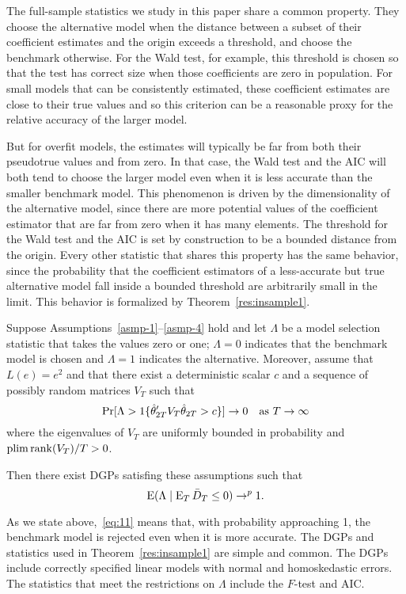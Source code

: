 \documentclass[12pt]{article}
\begin{document}
The full-sample statistics we study in this paper share a common
property. They choose the alternative model when the distance between
a subset of their coefficient estimates and the origin exceeds a
threshold, and choose the benchmark otherwise. For the Wald test, for
example, this threshold is chosen so that the test has correct size
when those coefficients are zero in population. For small models that
can be consistently estimated, these coefficient estimates are close
to their true values and so this criterion can be a reasonable proxy
for the relative accuracy of the larger model.

But for overfit models, the estimates will typically be far from both
their pseudotrue values and from zero. In that case, the Wald test and
the AIC will both tend to choose the larger model even when it is less
accurate than the smaller benchmark model. This phenomenon is driven
by the dimensionality of the alternative model, since there are more
potential values of the coefficient estimator that are far from zero
when it has many elements. The threshold for the Wald test and the AIC
is set by construction to be a bounded distance from the origin.
Every other statistic that shares this property has the same behavior,
since the probability that the coefficient estimators of a
less-accurate but true alternative model fall inside a bounded
threshold are arbitrarily small in the limit. This behavior is
formalized by Theorem~\ref{res:insample1}.
\begin{thm}\label{res:insample1}
  Suppose Assumptions~\ref{asmp-1}--\ref{asmp-4} hold and let
  $\Lambda$ be a model selection statistic that takes the values zero
  or one; $\Lambda = 0$ indicates that the benchmark model is chosen
  and $\Lambda = 1$ indicates the alternative.  Moreover, assume that
  $L(e) = e^2$ and that there exist a deterministic scalar $c$ and a
  sequence of possibly random matrices $V_T$ such that
  \begin{equation}\label{eq:25}
    \Pr[\Lambda > \operatorname{1}\{\hat\theta_{2T}' V_T \hat\theta_{2T} > c \}] \to 0
    \quad \text{as } T \to \infty
  \end{equation}
  where the eigenvalues of $V_T$ are uniformly bounded in probability
  and $\operatorname*{plim} \operatorname*{rank}(V_T)/T > 0$.

  Then there exist DGPs satisfing these assumptions such that
  \begin{equation}\label{eq:11}
    \operatorname{E}( \Lambda \mid \operatorname{E}_T \bar{D}_{T} \leq 0 ) \to^p 1.
  \end{equation}
\end{thm}
As we state above,~\eqref{eq:11} means that, with probability
approaching 1, the benchmark model is rejected even when it is more
accurate. The DGPs and statistics used in Theorem~\ref{res:insample1}
are simple and common. The DGPs include correctly specified linear
models with normal and homoskedastic errors. The statistics that meet
the restrictions on $\Lambda$ include the $F$-test and AIC.
\end{document}
